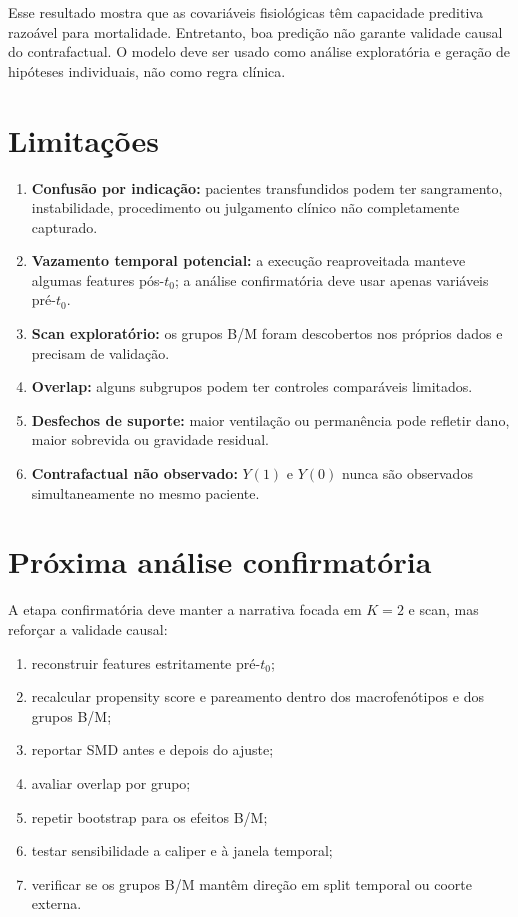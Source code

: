 Esse resultado mostra que as covariáveis fisiológicas têm capacidade preditiva razoável para mortalidade. Entretanto, boa predição não garante validade causal do contrafactual. O modelo deve ser usado como análise exploratória e geração de hipóteses individuais, não como regra clínica.

\section{Limitações}

\begin{enumerate}[leftmargin=1.5em, itemsep=0.3em]
  \item \textbf{Confusão por indicação:} pacientes transfundidos podem ter sangramento, instabilidade, procedimento ou julgamento clínico não completamente capturado.
  \item \textbf{Vazamento temporal potencial:} a execução reaproveitada manteve algumas features pós-$t_0$; a análise confirmatória deve usar apenas variáveis pré-$t_0$.
  \item \textbf{Scan exploratório:} os grupos B/M foram descobertos nos próprios dados e precisam de validação.
  \item \textbf{Overlap:} alguns subgrupos podem ter controles comparáveis limitados.
  \item \textbf{Desfechos de suporte:} maior ventilação ou permanência pode refletir dano, maior sobrevida ou gravidade residual.
  \item \textbf{Contrafactual não observado:} $Y(1)$ e $Y(0)$ nunca são observados simultaneamente no mesmo paciente.
\end{enumerate}

\section{Próxima análise confirmatória}

A etapa confirmatória deve manter a narrativa focada em $K=2$ e scan, mas reforçar a validade causal:

\begin{enumerate}[leftmargin=1.5em, itemsep=0.25em]
  \item reconstruir features estritamente pré-$t_0$;
  \item recalcular propensity score e pareamento dentro dos macrofenótipos e dos grupos B/M;
  \item reportar SMD antes e depois do ajuste;
  \item avaliar overlap por grupo;
  \item repetir bootstrap para os efeitos B/M;
  \item testar sensibilidade a caliper e à janela temporal;
  \item verificar se os grupos B/M mantêm direção em split temporal ou coorte externa.
\end{enumerate}

